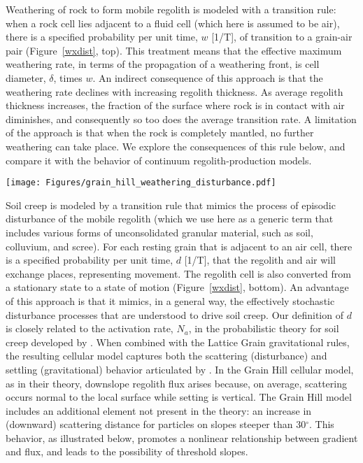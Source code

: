 \documentclass[esurf, manuscript]{copernicus}
\begin{document}
Weathering of rock to form mobile regolith is modeled with a transition rule: when a rock cell lies adjacent to a fluid cell (which here is assumed to be air), there is a specified probability per unit time, $w$ [1/T], of transition to a grain-air pair (Figure~\ref{wxdist}, top). This treatment means that the effective maximum weathering rate, in terms of the propagation of a weathering front, is cell diameter, $\delta$, times $w$. An indirect consequence of this approach is that the weathering rate declines with increasing regolith thickness. As average regolith thickness increases, the fraction of the surface where rock is in contact with air diminishes, and consequently so too does the average transition rate. A limitation of the approach is that when the rock is completely mantled, no further weathering can take place. We explore the consequences of this rule below, and compare it with the behavior of continuum regolith-production models.

\begin{figure*}[t]
\texttt{[image: Figures/grain\_hill\_weathering\_disturbance.pdf]}
\caption{Transitions representing rock-to-regolith transformation by weathering (top), and regolith disturbance (bottom), in which a stationary particle becomes mobile and switches position with a air cell. Illustration represents one of the six possible orientations.}
\label{wxdist}
\end{figure*}

Soil creep is modeled by a transition rule that mimics the process of episodic disturbance of the mobile regolith (which we use here as a generic term that includes various forms of unconsolidated granular material, such as soil, colluvium, and scree). For each resting grain that is adjacent to an air cell, there is a specified probability per unit time, $d$ [1/T], that the regolith and air will exchange places, representing movement. The regolith cell is also converted from a stationary state to a state of motion (Figure~\ref{wxdist}, bottom). An advantage of this approach is that it mimics, in a general way, the effectively stochastic disturbance processes that are understood to drive soil creep. Our definition of $d$ is closely related to the activation rate, $N_a$, in the probabilistic theory for soil creep developed by \citet{furbish2009statistical}. When combined with the Lattice Grain gravitational rules, the resulting cellular model captures both the scattering (disturbance) and settling (gravitational) behavior articulated by \citet{furbish2009statistical}. In the Grain Hill cellular model, as in their theory, downslope regolith flux arises because, on average, scattering occurs normal to the local surface while setting is vertical. The Grain Hill model includes an additional element not present in the \citet{furbish2009statistical} theory: an increase in (downward) scattering distance for particles on slopes steeper than 30$^\circ$. This behavior, as illustrated below, promotes a nonlinear relationship between gradient and flux, and leads to the possibility of threshold slopes.
\end{document}
